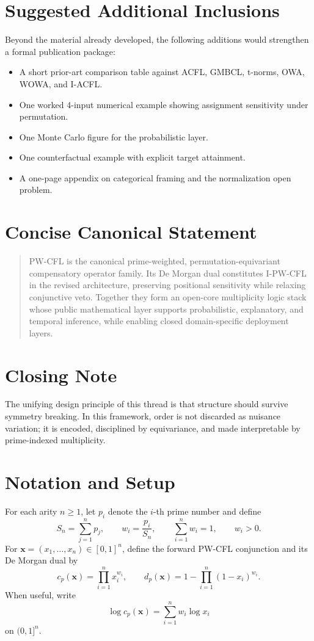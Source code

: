 \documentclass[11pt]{article}
\begin{document}
\section{Suggested Additional Inclusions}
Beyond the material already developed, the following additions would strengthen a formal publication package:
\begin{itemize}
  \item A short prior-art comparison table against ACFL, GMBCL, t-norms, OWA, WOWA, and I-ACFL.
  \item One worked 4-input numerical example showing assignment sensitivity under permutation.
  \item One Monte Carlo figure for the probabilistic layer.
  \item One counterfactual example with explicit target attainment.
  \item A one-page appendix on categorical framing and the normalization open problem.
\end{itemize}

\section{Concise Canonical Statement}
\begin{quote}
PW-CFL is the canonical prime-weighted, permutation-equivariant compensatory operator family. Its De Morgan dual constitutes I-PW-CFL in the revised architecture, preserving positional sensitivity while relaxing conjunctive veto. Together they form an open-core multiplicity logic stack whose public mathematical layer supports probabilistic, explanatory, and temporal inference, while enabling closed domain-specific deployment layers.
\end{quote}

\section{Closing Note}
The unifying design principle of this thread is that structure should survive symmetry breaking. In this framework, order is not discarded as nuisance variation; it is encoded, disciplined by equivariance, and made interpretable by prime-indexed multiplicity.

\appendix
\section{Notation and Setup}
For each arity $n \ge 1$, let $p_i$ denote the $i$-th prime number and define
\[
S_n = \sum_{j=1}^{n} p_j, \qquad w_i = \frac{p_i}{S_n}, \qquad \sum_{i=1}^n w_i = 1, \qquad w_i>0.
\]
For $\mathbf{x}=(x_1,\dots,x_n) \in [0,1]^n$, define the forward PW-CFL conjunction and its De Morgan dual by
\[
 c_p(\mathbf{x}) = \prod_{i=1}^n x_i^{w_i},
 \qquad
 d_p(\mathbf{x}) = 1 - \prod_{i=1}^n (1-x_i)^{w_i}.
\]
When useful, write
\[
\log c_p(\mathbf{x}) = \sum_{i=1}^n w_i \log x_i
\]
on $(0,1]^n$.
\end{document}
